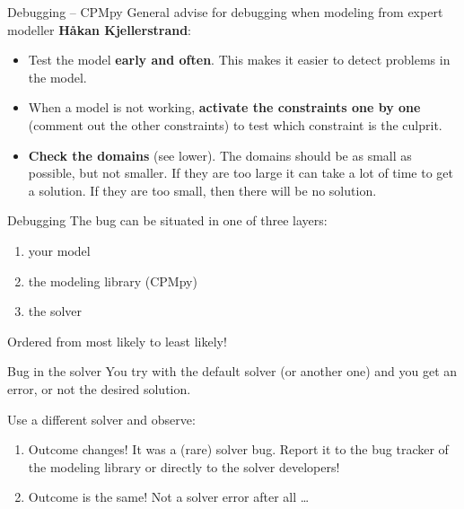\documentclass{cons-beamer}
\begin{document}
\begin{flashcardcpmpy}
	\begin{frame}{Debugging -- CPMpy}
		General advise for debugging when modeling from expert modeller\textbf{ Håkan Kjellerstrand}:
		\vfill
		
		\begin{itemize}
			\item Test the model \textbf{early and often}. This makes it easier to detect problems in the model. \vfill
			
			\item When a model is not working, \textbf{activate the constraints one by one} (\eg comment out the other constraints) to test which constraint is the culprit. 
			    \vfill
			
			\item \textbf{Check the domains} (see lower). The domains should be as small as possible, but not smaller. If they are too large it can take a lot of time to get a solution. If they are too small, then there will be no solution. \vfill
		\end{itemize}
	\end{frame}
\end{flashcardcpmpy}

\begin{frame}{Debugging}
	The bug can be situated in one of three layers:
	\begin{enumerate}
		\item your model
		\item the modeling library (CPMpy)
		\item the solver
	\end{enumerate}
	\vfill
	
	Ordered from most likely to least likely!
\end{frame}

\begin{frame}{Bug in the solver}
	You try with the default solver (or another one) and you get an error, or not the desired solution.
	\vfill
	
	\large
	Use a different solver and observe:
	\normalsize 
	\vfill
	
	\begin{enumerate}
		\item Outcome changes! It was a (rare) solver bug. Report it to the bug tracker of the modeling library or directly to the solver developers!
		\vfill
		
		\item Outcome is the same! Not a solver error after all \dots
	\end{enumerate}
\end{frame}
\end{document}
